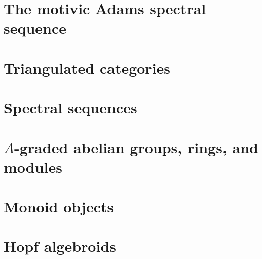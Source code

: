 \documentclass{amsart}
\theoremstyle{plain}
\theoremstyle{definition}
\newcommand{\0}{\mathbf{0}}
\renewcommand{\(}{\left(}
\renewcommand{\)}{\right)}
\newcommand{\1}{\mbf{1}}
\begin{document}
\section{The motivic Adams spectral sequence}\label{motivic}



\appendix

\section{Triangulated categories}\label{triangulated}



\section{Spectral sequences}\label{spectral_sequences}



\section{\texorpdfstring{$A$}{A}-graded abelian groups, rings, and modules}\label{graded_stuff}



\section{Monoid objects}\label{monoid_objects}



\section{Hopf algebroids}\label{hopf_algebroids}



\printbibliography
\end{document}
